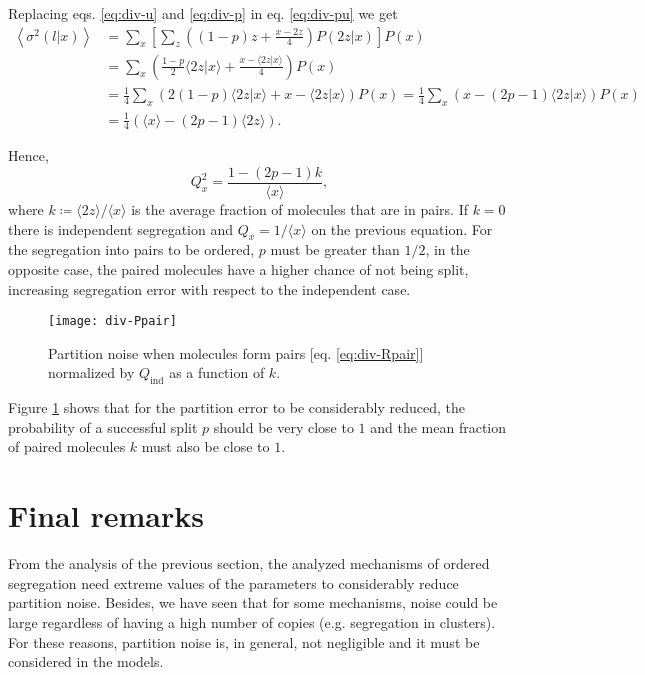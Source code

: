 Replacing eqs. \eqref{eq:div-u} and \eqref{eq:div-p} in eq. \eqref{eq:div-pu} we get
\begin{equation*}
  \begin{split}
    \left\langle\sigma^2(l|x)\right\rangle &=\sum_{x}\left[\sum_z\left((1-p)z+\frac{x-2z}{4}\right)P(2z|x)\right]P(x)\\
&=\sum_x\left(\frac{1-p}{2}\langle 2z|x\rangle+\frac{x-\langle 2z|x\rangle}{4}\right)P(x)\\
    &=\frac{1}{4}\sum_x\left(2(1-p)\langle 2z|x\rangle+x-\langle 2z|x\rangle\right)P(x) = \frac{1}{4}\sum_x\left(x-(2p-1)\langle 2z|x\rangle\right)P(x)\\
    &=\frac{1}{4}\left(\langle x\rangle - (2p-1)\langle 2z\rangle\right).
  \end{split}
\end{equation*}

Hence,
\begin{equation}
  \label{eq:div-Rpair}
  Q_x^2 = \frac{1 - (2p-1)k}{\langle x\rangle},
\end{equation}
where $k\coloneqq\langle 2z\rangle/\langle x\rangle$ is the average fraction of molecules that are in pairs. If $k=0$ there is independent segregation and $Q_x = 1/\langle x\rangle$ on the previous equation. For the segregation into pairs to be ordered, $p$ must be greater than $1/2$, in the opposite case, the paired molecules have a higher chance of not being split, increasing segregation error with respect to the independent case.
\begin{figure}[H]
  \centering
  \texttt{[image: div-Ppair]}
  \caption[Partition noise when molecules form pairs]{\label{fig:div-Ppair}Partition noise when molecules form pairs [eq. \eqref{eq:div-Rpair}] normalized by $Q_\text{ind}$ as a function of $k$.}
\end{figure}

Figure \ref{fig:div-Ppair} shows that for the partition error to be considerably reduced, the probability of a successful split $p$ should be very close to $1$ and the mean fraction of paired molecules $k$ must also be close to $1$.

\section{Final remarks}

From the analysis of the previous section, the analyzed mechanisms of ordered segregation need extreme values of the parameters to considerably reduce partition noise. Besides, we have seen that for some mechanisms, noise could be large regardless of having a high number of copies (e.g. segregation in clusters). For these reasons, partition noise is, in general, not negligible and it must be considered in the models.

